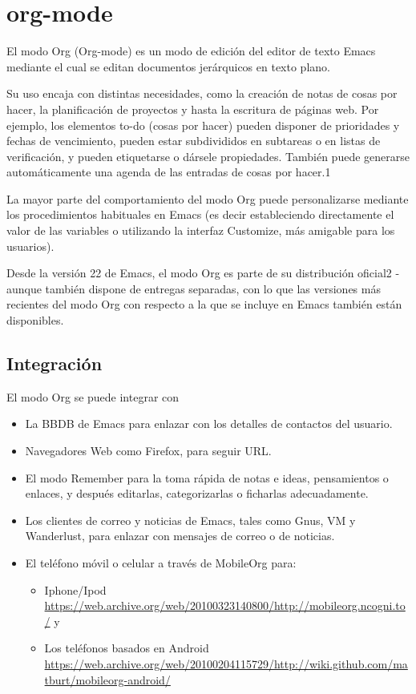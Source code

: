 \documentclass[11pt]{article}
\author{emiliano}
\date{\today}
\title{}
\begin{document}
\tableofcontents

\section{org-mode}
\label{sec:orgd1fd442}
El modo Org (Org-mode) es un modo de edición del editor de texto Emacs mediante el cual se editan documentos jerárquicos en texto plano.

Su uso encaja con distintas necesidades, como la creación de notas de cosas por hacer, la planificación de proyectos y hasta la escritura de páginas web. Por ejemplo, los elementos to-do (cosas por hacer) pueden disponer de prioridades y fechas de vencimiento, pueden estar subdivididos en subtareas o en listas de verificación, y pueden etiquetarse o dársele propiedades. También puede generarse automáticamente una agenda de las entradas de cosas por hacer.1​

La mayor parte del comportamiento del modo Org puede personalizarse mediante los procedimientos habituales en Emacs (es decir estableciendo directamente el valor de las variables o utilizando la interfaz Customize, más amigable para los usuarios).

Desde la versión 22 de Emacs, el modo Org es parte de su distribución oficial2​ - aunque también dispone de entregas separadas, con lo que las versiones más recientes del modo Org con respecto a la que se incluye en Emacs también están disponibles. 


\subsection{Integración}
\label{sec:orgaf3db38}
El modo Org se puede integrar con

\begin{itemize}
\item La BBDB de Emacs para enlazar con los detalles de contactos del usuario.
\item Navegadores Web como Firefox, para seguir URL.
\item El modo Remember para la toma rápida de notas e ideas, pensamientos o enlaces, y después editarlas, categorizarlas o ficharlas adecuadamente.
\item Los clientes de correo y noticias de Emacs, tales como Gnus, VM y Wanderlust, para enlazar con mensajes de correo o de noticias.
\item El teléfono móvil o celular a través de MobileOrg para:
  \begin{itemize}
  \item Iphone/Ipod \url{https://web.archive.org/web/20100323140800/http://mobileorg.ncogni.to/} y
  \item Los teléfonos basados en Android \url{https://web.archive.org/web/20100204115729/http://wiki.github.com/matburt/mobileorg-android/}
  \end{itemize}
\end{itemize}
\end{document}

